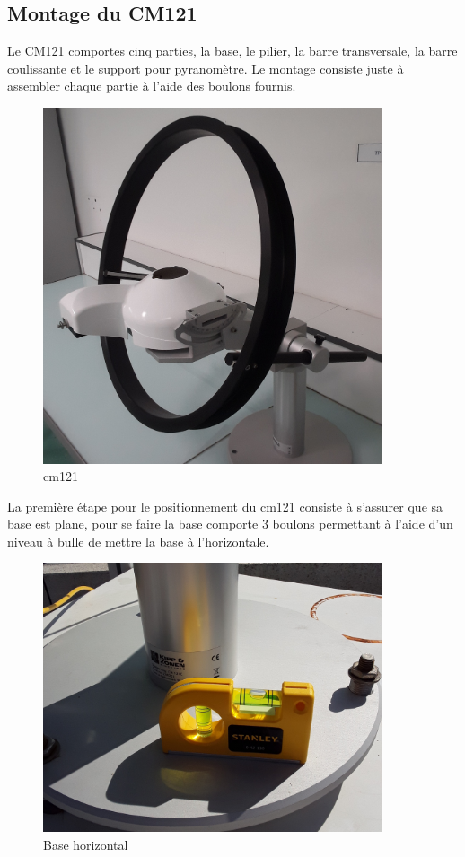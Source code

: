 \documentclass[12pt,a4paper]{article}
\begin{document}
\begin{flushleft}
\subsection{Montage du CM121}

Le CM121 comportes cinq parties, la base, le pilier, la barre transversale, la barre coulissante et le support pour pyranomètre. Le montage consiste juste à assembler chaque partie à l'aide des boulons fournis.

\begin{figure}[H]
\centering
\includegraphics[width=10cm]{image/montage/1.jpg} 
\caption{cm121}
\end{figure}


La première étape pour le positionnement du cm121 consiste à s'assurer que sa base est plane, pour se faire la base comporte 3 boulons permettant à l'aide d'un niveau à bulle de mettre la base à l'horizontale. 

\begin{figure}[H]
\centering
\includegraphics[width=10cm]{image/montage/2.jpg} 
\caption{Base horizontal}
\end{figure}



\end{flushleft}
\end{document}
